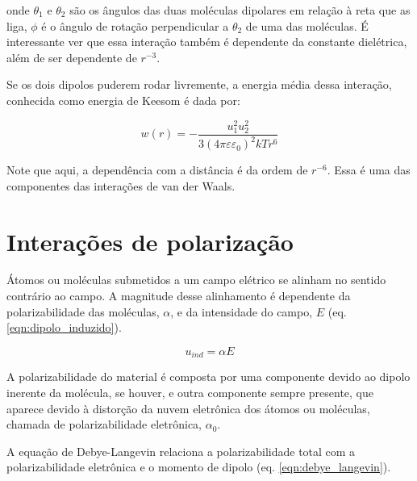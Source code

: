 	\noindent onde \(\theta_{ 1 }\) e \(\theta_{ 2 }\) são os ângulos das duas moléculas dipolares em relação à reta que as liga, \(\phi\) é o ângulo de rotação perpendicular a \(\theta_{ 2 }\) de uma das moléculas. É interessante ver que essa interação também é dependente da constante dielétrica, além de ser dependente de \(r^{-3}\).  %
	
	Se os dois dipolos puderem rodar livremente, a energia média dessa interação, conhecida como energia de Keesom é dada por:
	
	\begin{equation}
		w(r) = - \dfrac{u _ { 1 } ^ { 2 } u _ { 2 } ^ { 2 } }{ 3 \left( 4 \pi \varepsilon \varepsilon _ { 0 } \right) ^ { 2 } k T r ^ { 6 } }
		\label{eqn:energia_Keesom}
	\end{equation}  
	
	Note que aqui, a dependência com a distância é da ordem de \(r^{-6}\). Essa é uma das componentes das interações de van der Waals. 
	
	\section{Interações de polarização} 
	
	Átomos ou moléculas submetidos a um campo elétrico se alinham no sentido contrário ao campo. A magnitude desse alinhamento é dependente da polarizabilidade das moléculas, \(\alpha\), e da intensidade do campo, \(E\)  (eq. \ref{eqn:dipolo_induzido}).
	
	\begin{equation}
		u_{ind} = \alpha E
		\label{eqn:dipolo_induzido}
	\end{equation} 
	
	A polarizabilidade do material é composta por uma componente devido ao dipolo inerente da molécula, se houver, e outra componente sempre presente, que aparece devido à distorção da nuvem eletrônica dos átomos ou moléculas, chamada de polarizabilidade eletrônica, \(\alpha_0\). 
	
	A equação de Debye-Langevin relaciona a polarizabilidade total com a polarizabilidade eletrônica e o momento de dipolo (eq. \ref{eqn:debye_langevin}).
	

